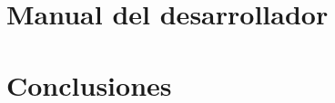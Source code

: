 \documentclass[a4paper,11pt,twoside]{book}
\begin{document}
\chapter{Manual del desarrollador}
\label{chap:chap10}


\chapter{Conclusiones}
\label{chap:chap11}


\chapter*{\bibname}

%

\begingroup
  \def\chapter*#1{}
\renewcommand{\bibname}{}



\backmatter


\end{document}
